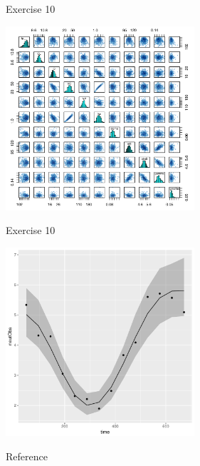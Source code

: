 \documentclass[presentation, allowframebreaks]{beamer}
\begin{document}
\begin{frame}[label={sec:orgc5441c0}]{Exercise 10}
\begin{center}
  \includegraphics[width=7cm]{FKPairs}
\end{center}
\end{frame}

\begin{frame}[label={sec:org262e7ea}]{Exercise 10}
\begin{center}
  \includegraphics[width=7cm]{FKModelPlots006.pdf}
\end{center}
\end{frame}

\begin{frame}[allowframebreaks]{Reference}

\footnotesize 
\end{frame}
\end{document}
